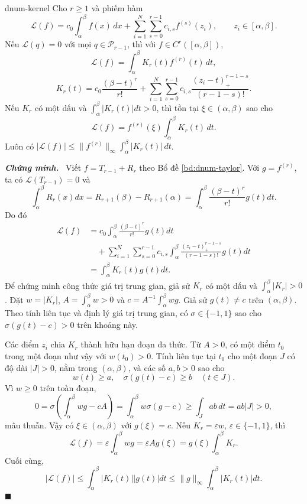 \documentclass[12pt,a4paper,oneside]{book}
\numberwithin{algorithm}{chapter}
\theoremstyle{definition}
\newenvironment{chungminh}{\par\medskip\noindent\textbf{\textit{\color{mainblue}Chứng minh.}}\ }{\hfill$\blacksquare$\par\medskip}
\begin{document}
\begin{bode}{}{dnum-kernel}
Cho $r\geq1$ và phiếm hàm
\[
 \mathcal L(f)=c_0\int_\alpha^\beta f(x)\,dx
 +\sum_{i=1}^{N}\sum_{s=0}^{r-1}c_{i,s}f^{(s)}(z_i),\qquad z_i\in[\alpha,\beta].
\]
Nếu $\mathcal L(q)=0$ với mọi $q\in\mathcal P_{r-1}$, thì với $f\in C^r([\alpha,\beta])$,
\begin{equation}\label{eq:dnum-kernel}
 \mathcal L(f)=\int_\alpha^\beta K_r(t)f^{(r)}(t)\,dt,
\end{equation}
\[
 K_r(t)=c_0\frac{(\beta-t)^r}{r!}
 +\sum_{i=1}^{N}\sum_{s=0}^{r-1}
 c_{i,s}\frac{(z_i-t)_+^{r-1-s}}{(r-1-s)!}.
\]
Nếu $K_r$ có một dấu và $\int_\alpha^\beta|K_r(t)|dt>0$, thì tồn tại $\xi\in(\alpha,\beta)$ sao cho
\[
 \mathcal L(f)=f^{(r)}(\xi)\int_\alpha^\beta K_r(t)\,dt.
\]
Luôn có $|\mathcal L(f)|\leq\lVert f^{(r)}\rVert_\infty\int_\alpha^\beta|K_r(t)|\,dt$.
\end{bode}
\begin{chungminh}
Viết $f=T_{r-1}+R_r$ theo Bổ đề \ref{bd:dnum-taylor}. Với $g=f^{(r)}$, ta có $\mathcal L(T_{r-1})=0$ và
\[
 \int_\alpha^\beta R_r(x)dx
 =R_{r+1}(\beta)-R_{r+1}(\alpha)
 =\int_\alpha^\beta\frac{(\beta-t)^r}{r!}g(t)dt.
\]
Do đó
\begin{align*}
 \mathcal L(f)&=c_0\int_\alpha^\beta\frac{(\beta-t)^r}{r!}g(t)dt\\
 &\quad+\sum_{i=1}^N\sum_{s=0}^{r-1}c_{i,s}
 \int_\alpha^\beta\frac{(z_i-t)_+^{r-1-s}}{(r-1-s)!}g(t)dt\\
 &=\int_\alpha^\beta K_r(t)g(t)dt.
\end{align*}
Để chứng minh công thức giá trị trung gian, giả sử $K_r$ có một dấu và $\int_\alpha^\beta|K_r|>0$. Đặt $w=|K_r|$, $A=\int_\alpha^\beta w>0$ và $c=A^{-1}\int_\alpha^\beta wg$. Giả sử $g(t)\ne c$ trên $(\alpha,\beta)$. Theo tính liên tục và định lý giá trị trung gian, có $\sigma\in\{-1,1\}$ sao cho $\sigma(g(t)-c)>0$ trên khoảng này.

Các điểm $z_i$ chia $K_r$ thành hữu hạn đoạn đa thức. Từ $A>0$, có một điểm $t_0$ trong một đoạn như vậy với $w(t_0)>0$. Tính liên tục tại $t_0$ cho một đoạn $J$ có độ dài $|J|>0$, nằm trong $(\alpha,\beta)$, và các số $a,b>0$ sao cho
\[
 w(t)\geq a,\quad \sigma(g(t)-c)\geq b\quad(t\in J).
\]
Vì $w\geq0$ trên toàn đoạn,
\[
 0=\sigma\left(\int_\alpha^\beta wg-cA\right)
 =\int_\alpha^\beta w\sigma(g-c)
 \geq\int_J ab\,dt=ab|J|>0,
\]
mâu thuẫn. Vậy có $\xi\in(\alpha,\beta)$ với $g(\xi)=c$. Nếu $K_r=\varepsilon w$, $\varepsilon\in\{-1,1\}$, thì
\[
 \mathcal L(f)=\varepsilon\int_\alpha^\beta wg
 =\varepsilon A g(\xi)=g(\xi)\int_\alpha^\beta K_r.
\]
Cuối cùng,
\[
 |\mathcal L(f)|\leq\int_\alpha^\beta|K_r(t)||g(t)|dt
 \leq\|g\|_\infty\int_\alpha^\beta|K_r(t)|dt.
\]
\end{chungminh}
\end{document}
